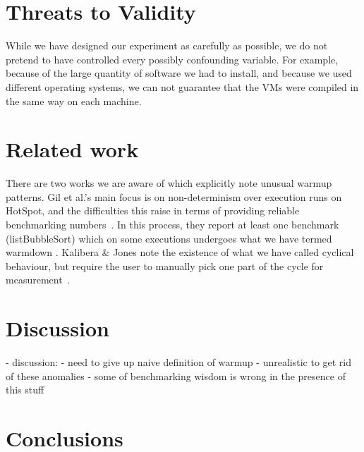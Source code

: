 \documentclass[10pt,preprint]{sigplanconf}
\newcommand{\kalibera}{Kalibera \& Jones\xspace}
\begin{document}
\section{Threats to Validity}
\label{sec:threats}

While we have designed our experiment as carefully as possible, we do not
pretend to have controlled every possibly confounding variable. For example,
because of the large quantity of software we had to install, and because we used
different operating systems, we can not guarantee that the VMs were compiled in
the same way on each machine. 



\section{Related work}

There are two works we are aware of which explicitly note unusual warmup
patterns. Gil et al.'s main focus is on non-determinism over execution runs on
HotSpot, and the difficulties this raise in terms of providing reliable
benchmarking numbers~\cite{gil11microbenchmark}. In this process, they report at
least one benchmark (listBubbleSort) which on some executions undergoes what we
have termed warmdown . \kalibera note the
existence of what we have called cyclical behaviour, but require the user to
manually pick one part of the cycle for measurement~\cite{kalibera13rigorous}.


\section{Discussion}
\label{sec:Discussion}

  - discussion:
    - need to give up naive definition of warmup
    - unrealistic to get rid of these anomalies
    - some of benchmarking wisdom is wrong in the presence of this stuff

\section{Conclusions}
\label{sec:conclusion}



\end{document}
